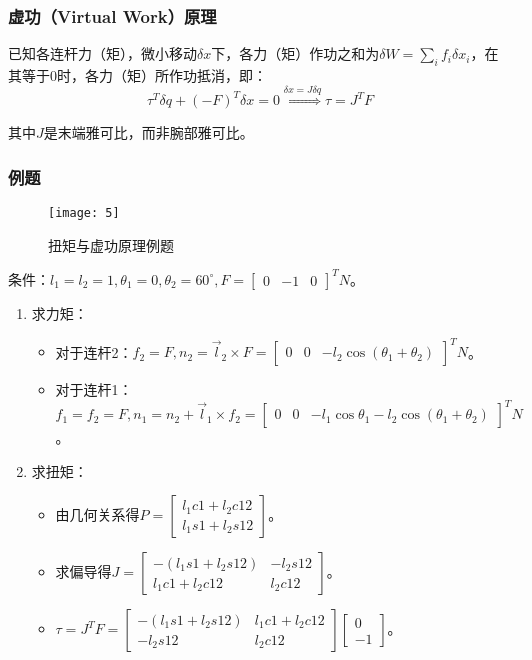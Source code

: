 \documentclass[
12pt, %
a4paper, 
oneside, %
headinclude,footinclude, %
]{scrartcl}
\begin{document}
\subsubsection[虚功原理]{虚功（Virtual Work）原理}
已知各连杆力（矩），微小移动$ \delta x $下，各力（矩）作功之和为$ \delta W = \sum_i f_i \delta x_i $，在其等于$ 0 $时，各力（矩）所作功抵消，即：
$$ \tau^T \delta q + (-F)^T \delta x = 0 \overset{\delta x = J \delta q}{\Longrightarrow} \tau = J^T F $$

其中$ J $是末端雅可比，而非腕部雅可比。
\subsubsection[例题]{例题}
\begin{figure}[H]
\centering 
\texttt{[image: 5]} 
\caption{扭矩与虚功原理例题}
\end{figure}

{\footnotesize
条件：$ l_1 = l_2 = 1, \theta_1 = 0, \theta_2 = 60^\circ, F = \begin{bmatrix} 0 & -1 & 0 \end{bmatrix}^T N $。
\begin{enumerate}
\item 求力矩：
\begin{itemize}
\item 对于连杆2：$ f_2 = F, n_2 = \vec{l}_2 \times F = \begin{bmatrix} 0 & 0 & -l_2 \cos(\theta_1 + \theta_2) \end{bmatrix}^T N $。
\item 对于连杆1：$ f_1 = f_2 = F, n_1 = n_2 + \vec{l}_1 \times f_2 = \begin{bmatrix} 0 & 0 & -l_1 \cos\theta_1 - l_2 \cos(\theta_1 + \theta_2) \end{bmatrix}^T N $。
\end{itemize} 
\item 求扭矩：
\begin{itemize}
\item 由几何关系得$ P = \begin{bmatrix} l_1 c1 + l_2 c12 \\ l_1 s1 + l_2 s12 \end{bmatrix} $。
\item 求偏导得$ J = \begin{bmatrix} -(l_1 s1 + l_2 s12) & -l_2 s12 \\ l_1 c1 + l_2 c12 & l_2 c12 \end{bmatrix} $。
\item $ \tau = J^T F = \begin{bmatrix} -(l_1 s1 + l_2 s12) & l_1 c1 + l_2 c12 \\ - l_2 s12 & l_2 c12 \end{bmatrix} \begin{bmatrix} 0 \\ -1 \end{bmatrix} $。
\end{itemize} 
\end{enumerate}
}
\end{document}
